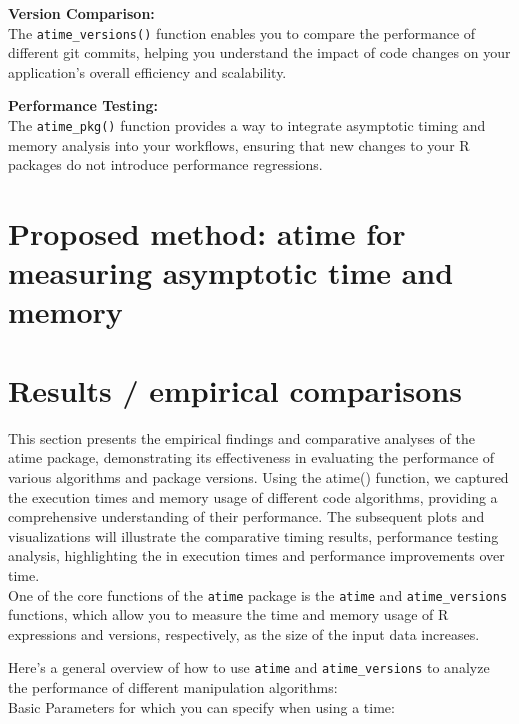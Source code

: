 \textbf{Version Comparison:} \\
The \texttt{atime\_versions()} function enables you to compare the performance of different git commits, helping you understand the impact of code changes on your application's overall efficiency and scalability.
\vspace{0.1in}

\textbf{Performance Testing:} \\
The \texttt{atime\_pkg()} function provides a way to integrate asymptotic timing and memory analysis into your workflows, ensuring that new changes to your R packages do not introduce performance regressions.
\vspace{0.1in}

\section{Proposed method: atime for measuring asymptotic time and memory}

\section{Results / empirical comparisons}

This section presents the empirical findings and comparative analyses of the atime package, demonstrating its effectiveness in evaluating the performance of various algorithms and package versions. Using the atime() function, we captured the execution times and memory usage of different code algorithms, providing a comprehensive understanding of their performance. The subsequent plots and visualizations will illustrate the comparative timing results, performance testing analysis, highlighting the in execution times and performance improvements over time. \\

\noindent One of the core functions of the \texttt{atime} package is the \texttt{atime} and \texttt{atime\_versions} functions, which allow you to measure the time and memory usage of R expressions and versions, respectively, as the size of the input data increases.

\noindent Here's a general overview of how to use \texttt{atime} and \texttt{atime\_versions} to analyze the performance of different manipulation algorithms:\\

\noindent Basic Parameters for which you can specify when using a time:

